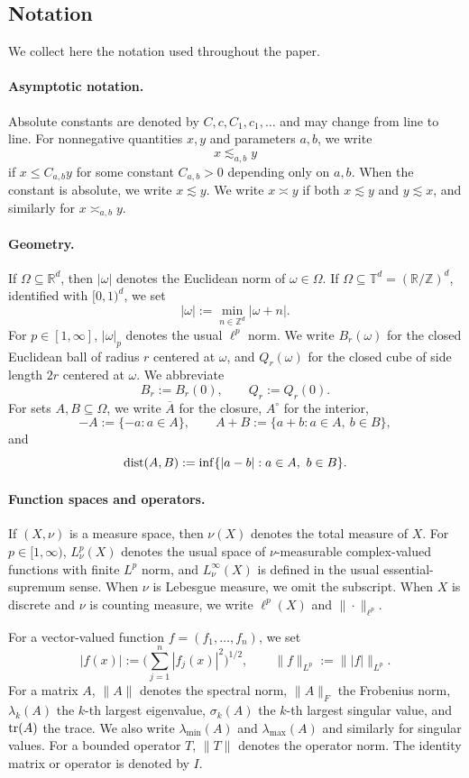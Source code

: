 \documentclass[11pt]{article}
\theoremstyle{definition}
\numberwithin{theorem}{section}
\numberwithin{lemma}{section}
\numberwithin{equation}{section}
\def\R{\mathbb{R}}
\def\T{\mathbb{T}}
\def\Z{\mathbb{Z}}
\renewcommand{\subset}{\subseteq}
\def\dist{{\rm dist}}
\def\trace{{\rm tr}}
\newcommand{\domain}{\Omega}
\numberwithin{equation}{section}
\begin{document}
\subsection{Notation}
\label{sec:notation}

We collect here the notation used throughout the paper.

\paragraph{Asymptotic notation.}
Absolute constants are denoted by $C,c,C_1,c_1,\dots$ and may change from line to line. For nonnegative quantities $x,y$ and parameters $a,b$, we write
\[
x\lesssim_{a,b} y
\]
if $x\le C_{a,b}y$ for some constant $C_{a,b}>0$ depending only on $a,b$. When the constant is absolute, we write $x\lesssim y$. We write $x\asymp y$ if both $x\lesssim y$ and $y\lesssim x$, and similarly for $x\asymp_{a,b} y$.

\paragraph{Geometry.}
If $\domain\subset \R^d$, then $|\omega|$ denotes the Euclidean norm of $\omega\in\domain$. If $\domain\subset \T^d=(\R/\Z)^d$, identified with $[0,1)^d$, we set
\[
|\omega|:=\min_{n\in\Z^d} |\omega+n|.
\]
For $p\in[1,\infty]$, $|\omega|_p$ denotes the usual $\ell^p$ norm. We write $B_r(\omega)$ for the closed Euclidean ball of radius $r$ centered at $\omega$, and $Q_r(\omega)$ for the closed cube of side length $2r$ centered at $\omega$. We abbreviate
\[
B_r:=B_r(0),
\qquad
Q_r:=Q_r(0).
\]
For sets $A,B\subset\domain$, we write $\overline A$ for the closure, $A^\circ$ for the interior,
\[
-A:=\{-a:a\in A\},
\qquad
A+B:=\{a+b:a\in A,\ b\in B\},
\]
and
\[
\dist(A,B):=\inf\{|a-b|:a\in A,\ b\in B\}.
\]

\paragraph{Function spaces and operators.}
If $(X,\nu)$ is a measure space, then $\nu(X)$ denotes the total measure of $X$. For $p\in[1,\infty)$, $L^p_\nu(X)$ denotes the usual space of $\nu$-measurable complex-valued functions with finite $L^p$ norm, and $L^\infty_\nu(X)$ is defined in the usual essential-supremum sense. When $\nu$ is Lebesgue measure, we omit the subscript. When $X$ is discrete and $\nu$ is counting measure, we write $\ell^p(X)$ and $\|\cdot\|_{\ell^p}$.

For a vector-valued function $f=(f_1,\dots,f_n)$, we set
\[
|f(x)|:=\Big(\sum_{j=1}^n |f_j(x)|^2\Big)^{1/2},
\qquad
\|f\|_{L^p}:=\||f|\|_{L^p}.
\]
For a matrix $A$, $\|A\|$ denotes the spectral norm, $\|A\|_F$ the Frobenius norm, $\lambda_k(A)$ the $k$-th largest eigenvalue, $\sigma_k(A)$ the $k$-th largest singular value, and $\trace(A)$ the trace. We also write $\lambda_{\min}(A)$ and $\lambda_{\max}(A)$ and similarly for singular values. For a bounded operator $T$, $\|T\|$ denotes the operator norm. The identity matrix or operator is denoted by $I$.
\end{document}
